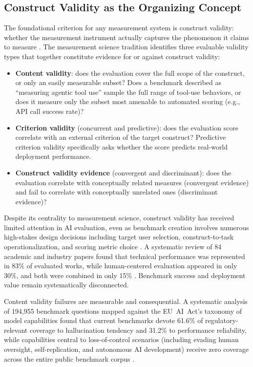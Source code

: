 \documentclass[preprint,12pt]{elsarticle}
\begin{document}
\subsection{Construct Validity as the Organizing Concept}
\label{sec:construct-validity}

The foundational criterion for any measurement system is construct validity: whether
the measurement instrument actually captures the phenomenon it claims to measure
\citep{cronbach1955}. The measurement science tradition identifies three evaluable
validity types that together constitute evidence for or against construct validity:

\begin{itemize}
  \item \textbf{Content validity}: does the evaluation cover the full scope of the
    construct, or only an easily measurable subset? Does a benchmark described as
    ``measuring agentic tool use'' sample the full range of tool-use behaviors, or
    does it measure only the subset most amenable to automated scoring (e.g., API call
    success rate)?
  \item \textbf{Criterion validity} (concurrent and predictive): does the evaluation
    score correlate with an external criterion of the target construct? Predictive
    criterion validity specifically asks whether the score predicts real-world
    deployment performance.
  \item \textbf{Construct validity evidence} (convergent and discriminant): does the
    evaluation correlate with conceptually related measures (convergent evidence) and
    fail to correlate with conceptually unrelated ones (discriminant evidence)?
\end{itemize}

Despite its centrality to measurement science, construct validity has received
limited attention in AI evaluation, even as benchmark creation involves numerous
high-stakes design decisions including target user selection,
construct-to-task operationalization, and scoring metric choice \citep{liu2024}. A
systematic review of 84 academic and industry papers found that technical performance
was represented in 83\% of evaluated works, while human-centered evaluation appeared
in only 30\%, and both were combined in only 15\% \citep{meimandi2025}. Benchmark
success and deployment value remain systematically disconnected.

Content validity failures are measurable and consequential. A systematic analysis of
194,955 benchmark questions mapped against the EU~AI~Act's taxonomy of model
capabilities found that current benchmarks devote 61.6\% of regulatory-relevant
coverage to hallucination tendency and 31.2\% to performance reliability, while
capabilities central to loss-of-control scenarios (including evading human oversight,
self-replication, and autonomous AI development) receive zero coverage across the
entire public benchmark corpus \citep{prandi2025}.
\end{document}
